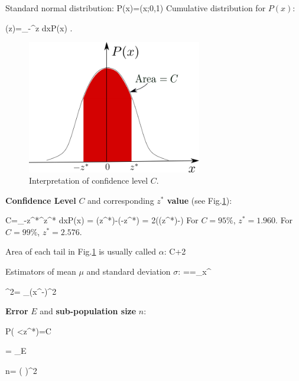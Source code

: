 Standard normal distribution:
\beq
P(x)=\caln(x;0,1)
\eeq
Cumulative distribution for $P(x)$:

\beq
\Phi(z)=\int_{-\infty}^z dx\;P(x)
\;.
\eeq

\begin{figure}[h!]
\centering
\includegraphics[width=3in]
{error-bars.png}
\caption{
Interpretation
of confidence level $C$.} 
\label{fig-error-bars}
\end{figure}

{\bf Confidence Level} $C$
and corresponding {\bf $z^*$ value}
(see Fig.\ref{fig-error-bars}):

\beq
C=\int_{-z^*}^{z^*} dx\;P(x) = 
\Phi(z^*)-\Phi(-z^*)
=
2\left(\Phi(z^*)-\right)
\eeq
For $C=95\%$,
$z^*=1.960$.
For $C=99\%$, $z^*=2.576$.

Area of each tail 
in Fig.\ref{fig-error-bars} is
usually called $\alpha$:
\beq
C+2
\eeq  

Estimators of 
mean $\mu$  and 
standard deviation $\sigma$:
\beq
\hat{\mu}==\sum_\s x^\s
\eeq

\beq
\hat{\sigma}^2=
\sum_\s (x^\s-)^2
\eeq



{\bf Error} $E$ and {\bf sub-population
size} $n$:

\beq
P\left(
<z^*\right)=C
\eeq

\beq
{} =
 \pm 
{}_{E}
\eeq

\beq
n= \left(
\right)^2
\eeq








